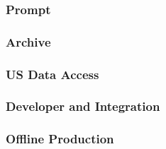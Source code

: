 \subsubsection{Prompt}

\subsubsection{Archive}

\subsubsection{US Data Access}

\subsubsection{Developer and Integration}

\subsubsection{Offline Production}